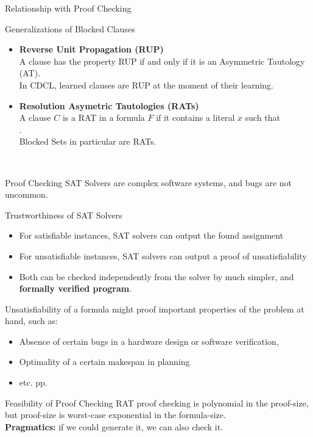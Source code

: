 \documentclass[t]{sdqbeamer}
\begin{document}
\begin{frame}{Relationship with Proof Checking}
\begin{block}{Generalizations of Blocked Clauses}~\\
\begin{itemize}\setlength{\itemsep}{1em}
    \item \textbf{Reverse Unit Propagation (RUP)}\\[1pt]
    A clause has the property RUP if and only if it is an Asymmetric Tautology (AT).\\[1ex]
    In CDCL, learned clauses are RUP at the moment of their learning.
    \item \textbf{Resolution Asymetric Tautologies (RATs)}\\[1pt]
    A clause $C$ is a RAT in a formula $F$ if it contains a literal $x$ such that\\
    .\\[1ex]
    Blocked Sets in particular are RATs.
\end{itemize}
~\\
\end{block}
\end{frame}


\begin{frame}{Proof Checking}
\vspace*{-2em}
SAT Solvers are complex software systems, and bugs are not uncommon.
\begin{block}{Trustworthiness of SAT Solvers}
\begin{itemize}\setlength{\itemsep}{1ex}
    \item For satisfiable instances, SAT solvers can output the found assignment
    \item For unsatisfiable instances, SAT solvers can output a proof of unsatisfiability
    \item Both can be checked independently from the solver by much simpler, and \textbf{formally verified program}.
\end{itemize}
\end{block}
\begin{example}
Unsatisfiability of a formula might proof important properties of the problem at hand, such as:\\
\begin{itemize}
    \item Absence of certain bugs in a hardware design or software verification, 
    \item Optimality of a certain makespan in planning
    \item etc. pp.
\end{itemize} 
\end{example}
\begin{block}{Feasibility of Proof Checking}
    RAT proof checking is polynomial in the proof-size, but proof-size is worst-case exponential in the formula-size.\\[1ex]
    \textbf{Pragmatics:}  if we could generate it, we can also check it.
\end{block}
\end{frame}
\end{document}
